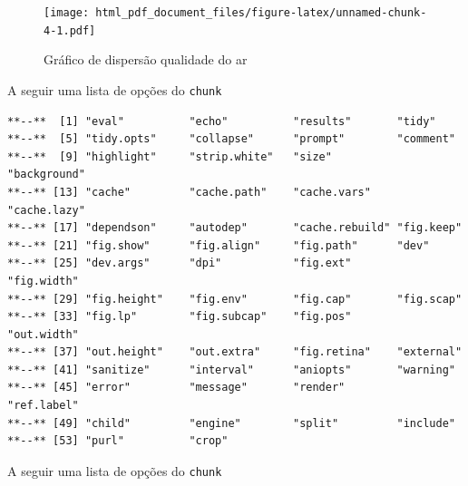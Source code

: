 \documentclass[12pt,brazil,]{article}
\newenvironment{Shaded}{\begin{snugshade}}{\end{snugshade}}
\newcommand{\KeywordTok}[1]{\textcolor[rgb]{0.26,0.66,0.93}{\textbf{#1}}}
\newcommand{\NormalTok}[1]{\textcolor[rgb]{0.74,0.68,0.62}{#1}}
\newcommand{\OperatorTok}[1]{\textcolor[rgb]{0.74,0.68,0.62}{#1}}
\begin{document}
\begin{figure}
\centering
\texttt{[image: html\_pdf\_document\_files/figure-latex/unnamed-chunk-4-1.pdf]}
\caption{Gráfico de dispersão qualidade do ar}
\end{figure}

A seguir uma lista de opções do \texttt{chunk}

\begin{Shaded}
\end{Shaded}

\begin{verbatim}
**--**  [1] "eval"          "echo"          "results"       "tidy"         
**--**  [5] "tidy.opts"     "collapse"      "prompt"        "comment"      
**--**  [9] "highlight"     "strip.white"   "size"          "background"   
**--** [13] "cache"         "cache.path"    "cache.vars"    "cache.lazy"   
**--** [17] "dependson"     "autodep"       "cache.rebuild" "fig.keep"     
**--** [21] "fig.show"      "fig.align"     "fig.path"      "dev"          
**--** [25] "dev.args"      "dpi"           "fig.ext"       "fig.width"    
**--** [29] "fig.height"    "fig.env"       "fig.cap"       "fig.scap"     
**--** [33] "fig.lp"        "fig.subcap"    "fig.pos"       "out.width"    
**--** [37] "out.height"    "out.extra"     "fig.retina"    "external"     
**--** [41] "sanitize"      "interval"      "aniopts"       "warning"      
**--** [45] "error"         "message"       "render"        "ref.label"    
**--** [49] "child"         "engine"        "split"         "include"      
**--** [53] "purl"          "crop"
\end{verbatim}

A seguir uma lista de opções do \texttt{chunk}

\begin{Shaded}
\end{Shaded}
\end{document}
